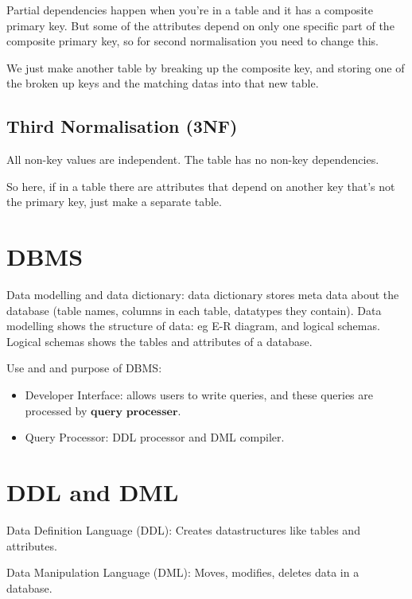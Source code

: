 \documentclass{article}
\theoremstyle{mytheoremstyle}
\theoremstyle{mytheoremstyle}
\theoremstyle{myproblemstyle}
\begin{document}
    Partial dependencies happen when you're in a table and it has a composite primary key. But some of the attributes depend on only one specific part of the composite primary key, so for second normalisation you need to change this.

    We just make another table by breaking up the composite key, and storing one of the broken up keys and the matching datas into that new table. 

    \subsection{Third Normalisation (3NF)}
    All non-key values are independent. The table has no non-key dependencies.
    
    So here, if in a table there are attributes that depend on another key that's not the primary key, just make a separate table.

    \section{DBMS}

    Data modelling and data dictionary: data dictionary stores meta data about the database (table names, columns in each table, datatypes they contain). Data modelling shows the structure of data: eg E-R diagram, and logical schemas. Logical schemas shows the tables and attributes of a database.

    Use and and purpose of DBMS: 

    \begin{itemize}
        \item Developer Interface: allows users to write queries, and these queries are processed by $\textbf{query processer}$.
        \item Query Processor: DDL processor and DML compiler. 
    \end{itemize}


    \section{DDL and DML}
    Data Definition Language (DDL): Creates datastructures like tables and attributes.

    Data Manipulation Language (DML): Moves, modifies, deletes data in a database.
\end{document}
